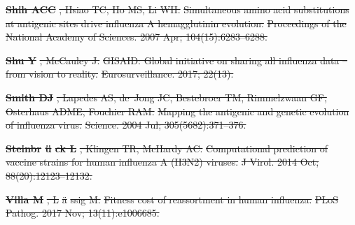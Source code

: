 \documentclass[9pt,lineno]{elife} %
\providecommand{\DIFdel}[1]{{\protect\color{red}\sout{#1}}}                      %
\providecommand{\DIFdeltex}[1]{{\protect\color{red}\sout{#1}}}                      %
\providecommand{\DIFdel}[1]{\texorpdfstring{\DIFdeltex{#1}}{}} %
\begin{document}
\textbf{%
\DIFdel{Shih ACC}}%
\DIFdel{, Hsiao TC, Ho MS, Li WH.
}%
\DIFdel{Simultaneous amino acid substitutions at antigenic sites drive
  influenza A hemagglutinin evolution.}%
\DIFdel{Proceedings of the National Academy of Sciences.  2007 Apr;
  104(15):6283--6288.
}%

\textbf{%
\DIFdel{Shu Y}}%
\DIFdel{, McCauley J.
}%
\DIFdel{GISAID: Global initiative on sharing all influenza data -- from
  vision to reality.
}%
\DIFdel{Eurosurveillance.  2017; 22(13).
}%

\textbf{%
\DIFdel{Smith DJ}}%
\DIFdel{, Lapedes AS, de~Jong JC, Bestebroer
  TM, Rimmelzwaan GF, Osterhaus ADME, Fouchier RAM.
}%
\DIFdel{Mapping the antigenic and genetic evolution of influenza virus.}%
\DIFdel{Science.  2004 Jul; 305(5682):371--376.
}%

\textbf{%
\DIFdel{Steinbr}%
\DIFdel{\"u}%
\DIFdel{ck L}}%
\DIFdel{, Klingen TR, McHardy AC.
}%
\DIFdel{Computational prediction of vaccine strains for human influenza A
  (H3N2) viruses.}%
\DIFdel{J Virol.  2014 Oct; 88(20):12123--12132.
}%

\textbf{%
\DIFdel{Villa M}}%
\DIFdel{, L}%
\DIFdel{\"a}%
\DIFdel{ssig M.
}%
\DIFdel{Fitness cost of reassortment in human influenza.}%
\DIFdel{PLoS Pathog.  2017 Nov; 13(11):e1006685.
}%
\end{document}
